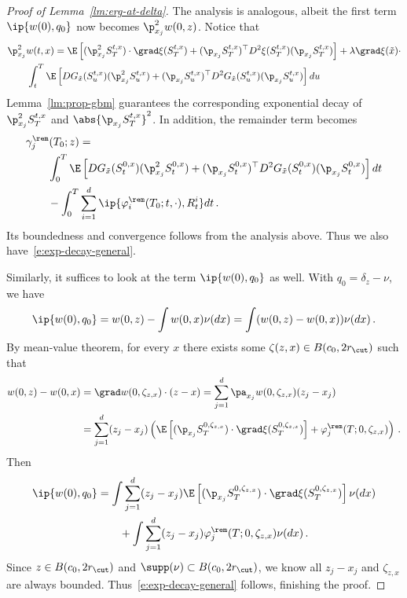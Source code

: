 \documentclass{amsart}
\begin{document}
\begin{proof}[Proof of Lemma~\ref{lm:erg-at-delta}]
	\step[Case $q_0 = \p_{x_j}^2 \delta_z$]
	The analysis is analogous, albeit the first term $\ip{w(0), q_0}$ now becomes $\p_{x_j}^2 w(0,z)$. 
	Notice that 
	\begin{align*}
		& \p_{x_j}^2 w(t,x) = \E \left[ (\p_{x_j}^2 S^{t,x}_T) \cdot \grad \xi(S^{t,x}_T) + (\p_{x_j} S^{t,x}_T)^\top D^2 \xi(S^{t,x}_T) (\p_{x_j} S^{t,x}_T) \right] + \lambda \grad\xi(\tilde x) \cdot \\
		& \qquad \int_t^T  \E \left[ DG_{\tilde x} (S^{t,x}_u) (\p_{x_j}^2 S^{t,x}_u)   + (\p_{x_j} S^{t,x}_u)^\top D^2 G_{\tilde x} (S^{t,x}_u) (\p_{x_j} S^{t,x}_u) \right] du 
	\end{align*}
	Lemma~\ref{lm:prop-gbm} guarantees the corresponding exponential decay of $\p_{x_j}^2 S^{t,x}_T$ and $\abs{\p_{x_j} S^{t,x}_T}^2$. 
	In addition, the remainder term becomes 
	\begin{align*}
		& \gamma_j^\rem(T_0;z) = \\
		& \qquad \int_0^T  \E \left[ DG_{\tilde x} (S^{0,x}_t) (\p_{x_j}^2 S^{0,x}_t) + (\p_{x_j} S^{0,x}_t)^\top D^2 G_{\tilde x} (S^{0,x}_t) (\p_{x_j} S^{0,x}_t) \right] dt \\
		& \qquad - \int_0^{T} \sum_{i=1}^d \ip{ \varphi_i^\rem(T_0;t,\cdot), R^i_t } dt \,.
	\end{align*}
	Its boundedness and convergence follows from the analysis above. 
	Thus we also have~\eqref{e:exp-decay-general}.

	\step[Case $q_0 = \delta_z - \nu$]
	Similarly, it suffices to look at the term $\ip{w(0), q_0}$ as well. 
	With $q_0 = \delta_z - \nu$, we have 
	\begin{align*}
		\ip{w(0), q_0} = w(0,z) - \int w(0,x) \nu(dx) = \int (w(0,z) - w(0,x)) \nu(dx) \,.
	\end{align*}
	By mean-value theorem, for every $x$ there exists some $\zeta(z,x) \in B(c_0, 2 r_\cut)$ such that 
	\begin{align*}
		w(0,z) - w(0,x) & = \grad w(0, \zeta_{z,x}) \cdot (z-x) = \sum_{j=1}^d \pa_{x_j} w(0,\zeta_{z,x}) (z_j - x_j) \\
		& = \sum_{j=1}^d (z_j - x_j) \left( \E \left[ (\p_{x_j} S^{0,\zeta_{z,x}}_{T}) \cdot \grad \xi (S^{0,\zeta_{z,x}}_{T}) \right] + \varphi_j^\rem(T;0,\zeta_{z,x}) \right) \,.
	\end{align*}
	Then 
	\begin{align*}
		\ip{w(0), q_0} & = \int \sum_{j=1}^d (z_j - x_j) \E \left[ (\p_{x_j} S^{0,\zeta_{z,x}}_{T}) \cdot \grad \xi (S^{0,\zeta_{z,x}}_{T}) \right] \nu(dx) \\
		& \qquad + \int \sum_{j=1}^d (z_j - x_j) \varphi_j^\rem(T;0,\zeta_{z,x}) \nu(dx) \,.
	\end{align*}
	Since $z \in B(c_0,2r_\cut)$ and $\supp(\nu) \subset B(c_0,2r_\cut)$, we know all $z_j - x_j$ and $\zeta_{z,x}$ are always bounded.
	Thus~\eqref{e:exp-decay-general} follows, finishing the proof. 
\end{proof}
\end{document}
